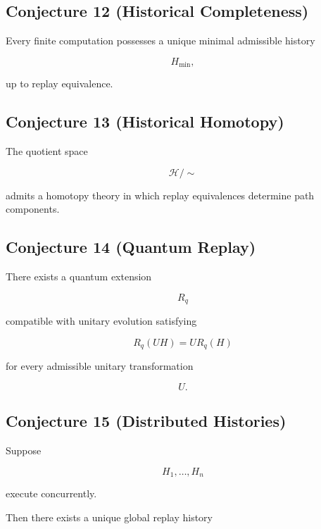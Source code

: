 \documentclass[12pt,oneside]{article}
\theoremstyle{definition}
\theoremstyle{remark}
\begin{document}
\subsection*{Conjecture 12 (Historical Completeness)}

Every finite computation possesses a unique minimal admissible history

\[
H_{\min},
\]

up to replay equivalence.

\subsection*{Conjecture 13 (Historical Homotopy)}

The quotient space

\[
\mathcal H/\!\!\sim
\]

admits a homotopy theory in which replay equivalences determine path
components.

\subsection*{Conjecture 14 (Quantum Replay)}

There exists a quantum extension

\[
R_q
\]

compatible with unitary evolution satisfying

\[
R_q(UH)
=
UR_q(H)
\]

for every admissible unitary transformation

\[
U.
\]

\subsection*{Conjecture 15 (Distributed Histories)}

Suppose

\[
H_1,
\ldots,
H_n
\]

execute concurrently.

Then there exists a unique global replay history
\end{document}

